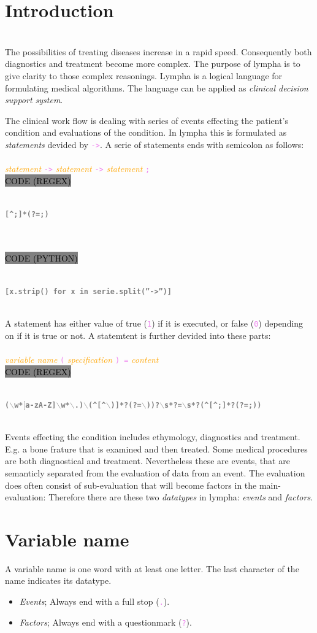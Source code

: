 \documentclass[15pt,a4paper,oneside]{article}
\newcommand{\regex}[1]{{\tiny\\\colorbox{grey}{\textcolor{black}{CODE (REGEX)}\hspace{0.87\textwidth}}}\vspace{-2.2em}\\\begin{framed}\bf{\textcolor{grey}{\vspace{-1.5em}\\\texttt{\small #1}}}\vspace{-0.33em}\end{framed}\vspace{-0.75em}}
\newcommand{\python}[1]{{\tiny\\\colorbox{grey}{\textcolor{black}{\tiny CODE (PYTHON)}\hspace{0.855\textwidth}}}\vspace{-2.2em}\\\begin{framed}\bf{\textcolor{grey}{\vspace{-1.5em}\\\texttt{\small #1}}}\vspace{-0.33em}\end{framed}\vspace{-0.75em}}
\newcommand{\code}[1]{{\textcolor{violet}{\texttt{\small #1}}}}
\newcommand{\comment}[1]{{\textcolor{orange}{\it #1}}}
\begin{document}
\section{Introduction}
\ \\
The possibilities of treating diseases increase in a rapid speed. Consequently both diagnostics and treatment become more complex. The purpose of {\sc lympha} is to give clarity to those complex reasonings. {\sc Lympha} is a logical language for formulating medical algorithms. The language can be applied as {\it clinical decision support system}.

The clinical work flow is dealing with series of events effecting the patient's condition and evaluations of the condition. In {\sc lympha} this is formulated as {\it statements} devided by \code{->}. A serie of statements ends with semicolon as follows:\\\\
\comment{statement} \code{->} \comment{statement} \code{->} \comment{statement} \code{;}
\regex{[\textasciicircum ;]*(?=;)}
\ \vspace{-2em}\\
\python{[x.strip() for x in serie.split(''->'')]}
\ \\
A statement has either value of true (\code{1}) if it is executed, or false (\code{0}) depending on if it is true or not. A statemtent is further devided into these parts:\\\\
\comment{variable name} \code{(} \comment{specification} \code{) =} \comment{content}
\regex{($\backslash$w*$[$a-zA-Z]$\backslash$w*$\backslash$.)$\backslash$(\textasciicircum[\textasciicircum$\backslash$)]*?(?=$\backslash$))?$\backslash$s*?=$\backslash$s*?(\textasciicircum[\textasciicircum ;]*?(?=;))}
\ \\
Events effecting the condition includes ethymology, diagnostics and treatment. E.g. a bone frature that is examined and then treated. Some medical procedures are both diagnostical and treatment. Nevertheless these are events, that are semanticly separated from the evaluation of data from an event. The evaluation does often consist of sub-evaluation that will become factors in the main-evaluation: Therefore there are these two {\it datatypes} in {\sc lympha}: {\it events} and {\it factors}.
\section{Variable name}
A variable name is one word with at least one letter. The last character of the name indicates its datatype.
\begin{itemize}
\item {\it Events}; Always end with a full stop (\code{.}).
\item {\it Factors}; Always end with a questionmark (\code{?}).
\end{itemize}
\end{document}
